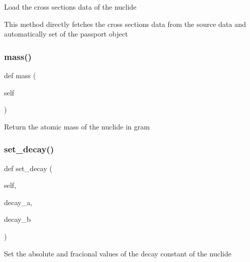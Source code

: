 \begin{DoxyVerb}Load the cross sections data of the nuclide

This method directly fetches the cross sections data from the source data and automatically set
of the passport object\end{DoxyVerb}
 \mbox{\label{classopenbu_1_1passport_1_1_passport_a69ae279139576858c6ca4dc9f5912717}} 
\subsubsection{\texorpdfstring{mass()}{mass()}}
{\footnotesize\ttfamily def mass (\begin{DoxyParamCaption}\item[{}]{self }\end{DoxyParamCaption})}

\begin{DoxyVerb}Return the atomic mass of the nuclide in gram\end{DoxyVerb}
 \mbox{\label{classopenbu_1_1passport_1_1_passport_ae04c67eded9e7f018b551d4be5d36f2c}} 
\subsubsection{\texorpdfstring{set\+\_\+decay()}{set\_decay()}}
{\footnotesize\ttfamily def set\+\_\+decay (\begin{DoxyParamCaption}\item[{}]{self,  }\item[{}]{decay\+\_\+a,  }\item[{}]{decay\+\_\+b }\end{DoxyParamCaption})}

\begin{DoxyVerb}Set the absolute and fracional values of the decay constant of the nuclide\end{DoxyVerb}
 \mbox{\label{classopenbu_1_1passport_1_1_passport_af0b4eabf69455a1ace31fadfc437695b}} 
